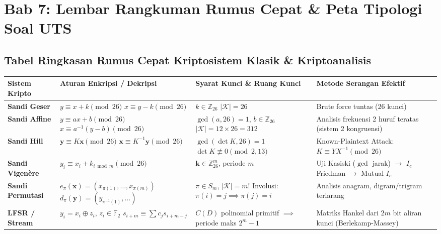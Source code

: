 \documentclass[11pt,a4paper]{article}
\begin{document}
\newpage
\section{Bab 7: Lembar Rangkuman Rumus Cepat \& Peta Tipologi Soal UTS}

\subsection{Tabel Ringkasan Rumus Cepat Kriptosistem Klasik \& Kriptoanalisis}
\begin{table}[H]
\centering
\small
\begin{tabular}{p{3.2cm} p{4.2cm} p{4.2cm} p{3.8cm}}
\toprule
\textbf{Sistem Kripto} & \textbf{Aturan Enkripsi / Dekripsi} & \textbf{Syarat Kunci \& Ruang Kunci} & \textbf{Metode Serangan Efektif} \\
\midrule
\textbf{Sandi Geser} & $y \equiv x + k \pmod{26}$ \newline $x \equiv y - k \pmod{26}$ & $k \in \mathbb{Z}_{26}$ \newline $|\mathcal{K}| = 26$ & Brute force tuntas (26 kunci) \\
\midrule
\textbf{Sandi Affine} & $y \equiv ax + b \pmod{26}$ \newline $x \equiv a^{-1}(y - b) \pmod{26}$ & $\gcd(a, 26) = 1$, $b \in \mathbb{Z}_{26}$ \newline $|\mathcal{K}| = 12 \times 26 = 312$ & Analisis frekuensi 2 huruf teratas (sistem 2 kongruensi) \\
\midrule
\textbf{Sandi Hill} & $\mathbf{y} \equiv K\mathbf{x} \pmod{26}$ \newline $\mathbf{x} \equiv K^{-1}\mathbf{y} \pmod{26}$ & $\gcd(\det K, 26) = 1$ \newline $\det K \not\equiv 0 \pmod{2, 13}$ & Known-Plaintext Attack: $K \equiv Y X^{-1} \pmod{26}$ \\
\midrule
\textbf{Sandi Vigen\`ere} & $y_i \equiv x_i + k_{i \bmod m} \pmod{26}$ & $\mathbf{k} \in \mathbb{Z}_{26}^m$, periode $m$ & Uji Kasiski ($\gcd$ jarak) $\to$ $I_c$ Friedman $\to$ Mutual $I_c$ \\
\midrule
\textbf{Sandi Permutasi} & $e_\pi(\mathbf{x}) = (x_{\pi(1)}, \dots, x_{\pi(m)})$ \newline $d_\pi(\mathbf{y}) = (y_{\pi^{-1}(1)}, \dots)$ & $\pi \in S_m$, $|\mathcal{K}| = m!$ \newline Involusi: $\pi(i) = j \implies \pi(j) = i$ & Analisis anagram, digram/trigram terlarang \\
\midrule
\textbf{LFSR / Stream} & $y_i = x_i \oplus z_i$, $z_i \in \mathbb{F}_2$ \newline $s_{i+m} \equiv \sum c_j s_{i+m-j}$ & $C(D)$ polinomial primitif $\implies$ periode maks $2^m - 1$ & Matriks Hankel dari $2m$ bit aliran kunci (Berlekamp-Massey) \\
\bottomrule
\end{tabular}
\end{table}
\end{document}
